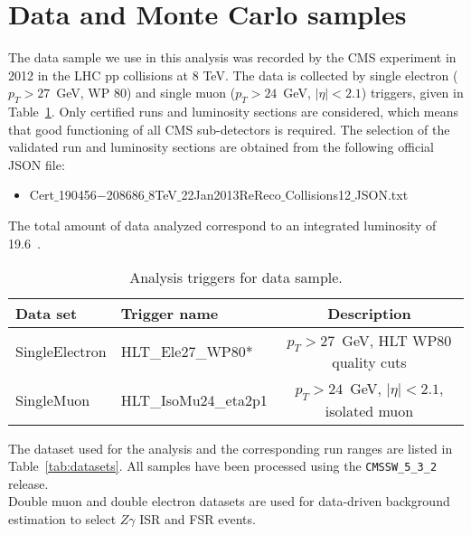 \section{Data and Monte Carlo samples}
\label{sec:DataAndMC}

The data sample we use in this analysis was recorded by the CMS experiment 
in 2012 in the LHC pp collisions at 8 TeV. The data is collected by single electron ($p_T>27$~GeV, WP 80) 
and single muon ($p_T>24$~GeV, $|\eta|<2.1$) triggers,
given in Table~\ref{tab:triggers}. 
Only certified runs and luminosity sections are considered, which 
means that good functioning of all CMS sub-detectors is required.
The selection of the validated run and luminosity sections are obtained from the following official JSON file:
\begin{itemize}
\item{\small{Cert$\_$190456$-$208686$\_$8TeV$\_$22Jan2013ReReco$\_$Collisions12$\_$JSON.txt}}
\end{itemize}
 The total 
amount of data analyzed correspond to an integrated luminosity of 19.6~\fbinv.

\begin{table}[htbp]
  \begin{center}
 {\small
  \begin{tabular} {l|l|c}
\hline
  Data set & Trigger name & Description\\
  \hline \hline
  SingleElectron & HLT\_Ele27\_WP80*        & $p_T>27$~GeV, HLT WP80 quality cuts \\
  \hline
  SingleMuon & HLT\_IsoMu24\_eta2p1      & $p_T>24$~GeV, $|\eta|<2.1$, isolated muon \\
  \hline
  \end{tabular}
}
  \caption{Analysis triggers for data sample.\label{tab:triggers}}
  \end{center}
\end{table}

The dataset used for the analysis and the corresponding run ranges are 
listed in Table~\ref{tab:datasets}. All samples have been processed using the 
\texttt{CMSSW\_5\_3\_2} release.\\

Double muon and double electron datasets are used for data-driven background estimation to select $Z\gamma$ ISR and FSR events.\\

